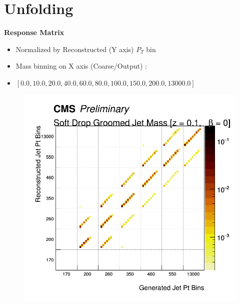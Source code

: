 \documentclass{beamer}
\begin{document}
\section{Unfolding}
\begin{frame}{\textbf{Response Matrix}}
\vspace{.5mm}

\begin{itemize}
  \item Normalized by Reconstructed (Y axis) $P_T$ bin
  \item Mass binning on X axis (Coarse/Output) :
  \item $[0.0, 10.0, 20.0, 40.0, 60.0, 80.0, 100.0, 150.0, 200.0, 13000.0]$
\end{itemize}


\begin{figure}
\centering
\includegraphics[scale=.25]{Jun25_unfoldPlots_sdB0/aResponseMatrix_NormalizedbyPtbin.png}
\end{figure}



\end{frame}
\end{document}
